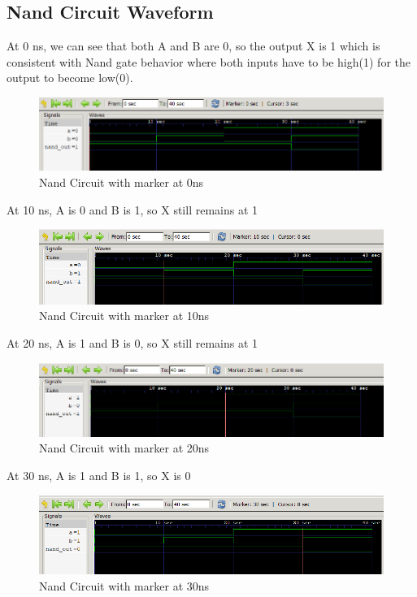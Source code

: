 \documentclass[12pt]{article}
\begin{document}
\subsection{Nand Circuit Waveform}

At 0 ns, we can see that both A and B are 0, so the output X is 1 which is consistent with Nand gate behavior where both inputs have to be high(1) for the output to become low(0).
\begin{figure}[h]
    \centering
    \includegraphics[width = 1.0\textwidth]{figs/Nand0.png}
    \caption{Nand Circuit with marker at 0ns}
    \label{fig:enter-label}
\end{figure}

At 10 ns, A is 0 and B is 1, so X still remains at 1
\begin{figure}[h]
    \centering
    \includegraphics[width = 1.0\textwidth]{figs/nand10.png}
    \caption{Nand Circuit with marker at 10ns}
    \label{fig:enter-label}
\end{figure}

\newpage

At 20 ns, A is 1 and B is 0, so X still remains at 1
\begin{figure}[h]
    \centering
    \includegraphics[width = 1.0\textwidth]{figs/Nand20.png}
    \caption{Nand Circuit with marker at 20ns}
    \label{fig:enter-label}
\end{figure}


At 30 ns, A is 1 and B is 1, so X is 0
\begin{figure}[h]
    \centering
    \includegraphics[width = 1.0\textwidth]{figs/Nand30.png}
    \caption{Nand Circuit with marker at 30ns}
    \label{fig:enter-label}
\end{figure}
\end{document}

